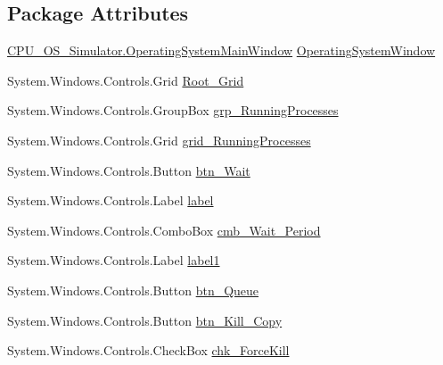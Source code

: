 \subsection*{Package Attributes}
\begin{DoxyCompactItemize}
\item 
\hyperlink{class_c_p_u___o_s___simulator_1_1_operating_system_main_window}{C\+P\+U\+\_\+\+O\+S\+\_\+\+Simulator.\+Operating\+System\+Main\+Window} \hyperlink{class_c_p_u___o_s___simulator_1_1_operating_system_main_window_ad42ee30cd6108b34ac88e9721db11b75}{Operating\+System\+Window}
\item 
System.\+Windows.\+Controls.\+Grid \hyperlink{class_c_p_u___o_s___simulator_1_1_operating_system_main_window_aaa4cd76a5ec5398ec2feacccbe5208b4}{Root\+\_\+\+Grid}
\item 
System.\+Windows.\+Controls.\+Group\+Box \hyperlink{class_c_p_u___o_s___simulator_1_1_operating_system_main_window_a07edb0a4de990e8120b24421e66f44ec}{grp\+\_\+\+Running\+Processes}
\item 
System.\+Windows.\+Controls.\+Grid \hyperlink{class_c_p_u___o_s___simulator_1_1_operating_system_main_window_a628b5d00213f20c361f776b85b3f7115}{grid\+\_\+\+Running\+Processes}
\item 
System.\+Windows.\+Controls.\+Button \hyperlink{class_c_p_u___o_s___simulator_1_1_operating_system_main_window_a3026145dbda6d838d6d542ff560c76af}{btn\+\_\+\+Wait}
\item 
System.\+Windows.\+Controls.\+Label \hyperlink{class_c_p_u___o_s___simulator_1_1_operating_system_main_window_a900faf1e6edab278754c736ccbf0f1df}{label}
\item 
System.\+Windows.\+Controls.\+Combo\+Box \hyperlink{class_c_p_u___o_s___simulator_1_1_operating_system_main_window_a4da0c086d71c3b794c9cd816aafeac88}{cmb\+\_\+\+Wait\+\_\+\+Period}
\item 
System.\+Windows.\+Controls.\+Label \hyperlink{class_c_p_u___o_s___simulator_1_1_operating_system_main_window_a4a8e9f811e590b3af2e2391740077937}{label1}
\item 
System.\+Windows.\+Controls.\+Button \hyperlink{class_c_p_u___o_s___simulator_1_1_operating_system_main_window_a241f1be0b04ce501c83e182629a6c694}{btn\+\_\+\+Queue}
\item 
System.\+Windows.\+Controls.\+Button \hyperlink{class_c_p_u___o_s___simulator_1_1_operating_system_main_window_a408a9f81462c276937e813344d29fc3c}{btn\+\_\+\+Kill\+\_\+\+Copy}
\item 
System.\+Windows.\+Controls.\+Check\+Box \hyperlink{class_c_p_u___o_s___simulator_1_1_operating_system_main_window_a3dea755536813ea2df09cfae7d946139}{chk\+\_\+\+Force\+Kill}

\end{DoxyCompactItemize}
